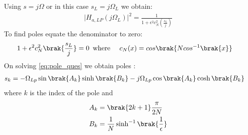 \documentclass{article}
\begin{document}
\begin{enumerate}
Using $s=j\Omega$ or in this case $s_{L}=j\Omega_{L}$ we obtain:
\begin{align}
    \vert H_{a,LP}(j\Omega_L)\vert^2 = \frac{1}{1 + \epsilon^2c_N^2(\frac{s_L}{j})}
\end{align}
To find poles equate the denominator to zero:
\begin{align}
    {1 + \epsilon^2c_N^2\brak{\frac{s_L}{j}}} &=0\hspace{5pt }
    \text{where } \hspace{10pt} c_N(x) = cos\brak{Ncos^{-1}\brak{x}} \label{eq:pole_ques}
\end{align}
On solving \eqref{eq:pole_ques} we obtain poles :
\begin{align}
    s_{k} &= -\Omega_{Lp} \sin\brak{A_k}\sinh\brak{B_k} - j\Omega_{Lp}\cos\brak{A_k}\cosh\brak{B_k}
\end{align}
where $k$ is the index of the pole and \\
\begin{align}
    A_k &= \brak{2k+1}\frac{\pi}{2N}\\
    B_k &= \frac{1}{N} \sinh^{-1}\brak{\frac{1}{\epsilon}}
\end{align}


\end{enumerate}
\end{document}
